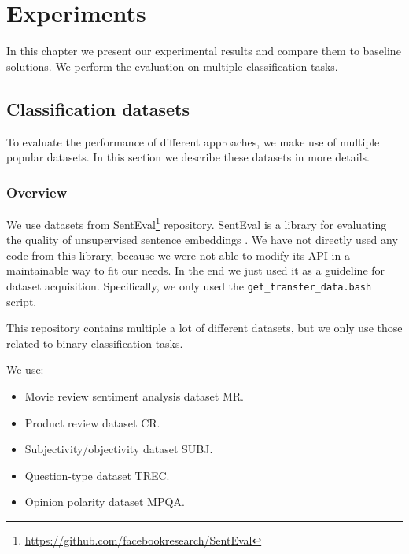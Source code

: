 \chapter{Experiments}

In this chapter we present our experimental results and compare them to baseline solutions.
We perform the evaluation on multiple classification tasks. 

\section{Classification datasets}
    
    To evaluate the performance of different approaches, we make use of multiple popular datasets.
    In this section we describe these datasets in more details.
    
    \subsection{Overview} \label{sec:data:overview}
    
    We use datasets from  SentEval\footnote{\url{https://github.com/facebookresearch/SentEval}} repository.
    SentEval is a library for evaluating the quality of unsupervised sentence embeddings \cite{conneau2017supervised}.
    We have not directly used  any code from this library, because we were not able to modify its API in a maintainable way to fit our needs. 
    In the end we just used it as a guideline for dataset acquisition.
    Specifically, we only used the \texttt{get\_transfer\_data.bash} script.
    
    This repository contains multiple a lot of different datasets, 
    but we only use those related to binary classification tasks.
    
    We use:
    \begin{itemize}
        \item Movie review sentiment analysis dataset MR.
        \item Product review dataset CR.
        \item Subjectivity/objectivity dataset SUBJ.
        \item Question-type dataset TREC.
        \item Opinion polarity dataset MPQA.
    \end{itemize}
    
